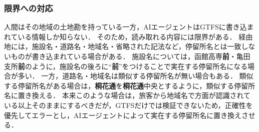 \subsubsection{限界への対応}

人間はその地域の土地勘を持っている一方，AIエージェントはGTFSに書き込まれている情報しか知らない．
そのため，読み取れる内容には限界がある．
経由地には，施設名・道路名・地域名・省略された記法など，停留所名とは一致しないものが書き込まれている場合がある．
施設名については，函館高専\textbf{前}・亀田支所\textbf{前}のように，施設名の後ろに``\textbf{前}''をつけることで実在する停留所名になる場合が多い．
一方，道路名・地域名は類似する停留所名が無い場合もある．
類似する停留所名がある場合は，\textbf{桐花通}を\textbf{桐花通}中央とするように，類似する停留所名に置き換える．
本来このような場合は，旅客から地域名で方面が認識されている以上そのままにするべきだが，GTFSだけでは検証できないため，正確性を優先してエラーとし，AIエージェントによって実在する停留所名に置き換えさせる．

